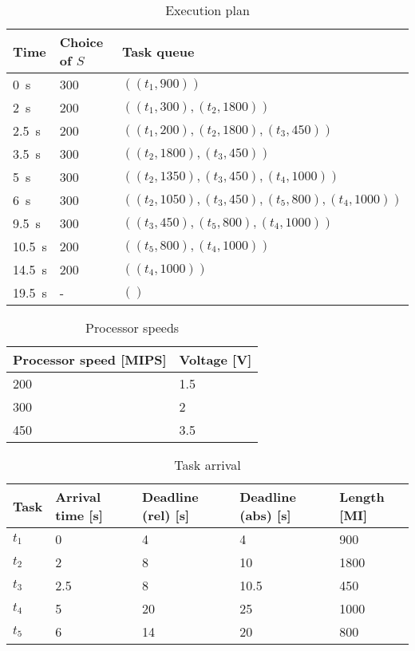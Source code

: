 \documentclass[a4paper]{scrreprt}
\begin{document}
\begin{table}
		\centering
		\begin{tabular}{lll}
				\toprule
				Time & Choice of $S$ & Task queue \\
				\midrule
				\SI{0}{\s} & 300 & $((t_1, 900))$ \\
				\SI{2}{\s} & 200 & $((t_1, 300), (t_2, 1800))$ \\
				\SI{2.5}{\s} & 200 & $((t_1, 200), (t_2, 1800), (t_3, 450))$ \\
				\SI{3.5}{\s} & 300 & $((t_2, 1800), (t_3, 450))$ \\
				\SI{5}{\s} & 300 & $((t_2, 1350), (t_3, 450), (t_4, 1000))$ \\
				\SI{6}{\s} & 300 & $((t_2, 1050), (t_3, 450), (t_5, 800), (t_4, 1000))$ \\
				\SI{9.5}{\s} & 300 & $((t_3, 450), (t_5, 800), (t_4, 1000))$ \\
				\SI{10.5}{\s} & 200 & $((t_5, 800), (t_4, 1000))$ \\
				\SI{14.5}{\s} & 200 & $((t_4, 1000))$ \\
				\SI{19.5}{\s} & - & $()$ \\
				\bottomrule
		\end{tabular}
		\caption{Execution plan}
		\label{tbl:execution_plan}
\end{table}

\begin{table}
		\centering
		\begin{tabular}{ll}
				\toprule
				Processor speed [MIPS] & Voltage [V] \\
				\midrule
				200 & 1.5 \\
				300 & 2 \\
				450 & 3.5 \\
				\bottomrule
		\end{tabular}
		\caption{Processor speeds}
		\label{tbl:processor_speeds}
\end{table}

\begin{table}
		\centering
		\begin{tabular}{lllll}
				\toprule
				Task & Arrival time [s] & Deadline (rel) [s] & Deadline (abs) [s] & Length [MI] \\
				\midrule
				$t_1$ & 0 & 4 & 4 & 900 \\
				$t_2$ & 2 & 8 & 10 & 1800 \\
				$t_3$ & 2.5 & 8 & 10.5 & 450 \\
				$t_4$ & 5 & 20 & 25 & 1000 \\
				$t_5$ & 6 & 14 & 20 & 800 \\
				\bottomrule
		\end{tabular}
		\caption{Task arrival}
		\label{tbl:tasks}
\end{table}
\end{document}
